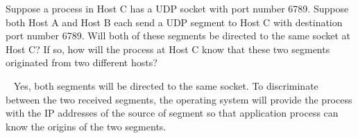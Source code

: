 \begin{exercise}[]{Suppose a process in Host C has a UDP socket with port number 6789. Suppose both Host A and Host B each send a UDP segment to Host C with destination port number 6789. Will both of these segments be directed to the same socket at Host C? If so, how will the process at Host C know that these two segments originated from two different hosts?}
  \begin{solution}
  \par{~}
  Yes, both segments will be directed to the same socket. To discriminate between the two received segments, the operating system will provide the process with the IP addresses of the source of segment so that application process can know the origins of the two segments.
  \end{solution}
  \label{ex1}
\end{exercise}


